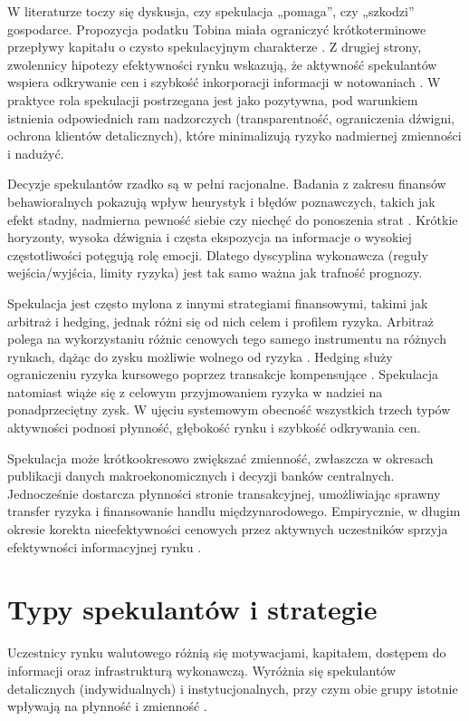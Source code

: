 W literaturze toczy się dyskusja, czy spekulacja „pomaga”, czy „szkodzi” gospodarce. Propozycja podatku Tobina miała ograniczyć krótkoterminowe przepływy kapitału o czysto spekulacyjnym charakterze \parencite{tobin1978}. Z drugiej strony, zwolennicy hipotezy efektywności rynku wskazują, że aktywność spekulantów wspiera odkrywanie cen i szybkość inkorporacji informacji w notowaniach \parencite{fama1970}. W praktyce rola spekulacji postrzegana jest jako pozytywna, pod warunkiem istnienia odpowiednich ram nadzorczych (transparentność, ograniczenia dźwigni, ochrona klientów detalicznych), które minimalizują ryzyko nadmiernej zmienności i nadużyć.


Decyzje spekulantów rzadko są w pełni racjonalne. Badania z zakresu finansów behawioralnych pokazują wpływ heurystyk i błędów poznawczych, takich jak efekt stadny, nadmierna pewność siebie czy niechęć do ponoszenia strat \parencite{shleifer2000}. Krótkie horyzonty, wysoka dźwignia i częsta ekspozycja na informacje o wysokiej częstotliwości potęgują rolę emocji. Dlatego dyscyplina wykonawcza (reguły wejścia/wyjścia, limity ryzyka) jest tak samo ważna jak trafność prognozy.


Spekulacja jest często mylona z innymi strategiami finansowymi, takimi jak arbitraż i hedging, jednak różni się od nich celem i profilem ryzyka. Arbitraż polega na wykorzystaniu różnic cenowych tego samego instrumentu na różnych rynkach, dążąc do zysku możliwie wolnego od ryzyka \parencite{fabozzi2015}. Hedging służy ograniczeniu ryzyka kursowego poprzez transakcje kompensujące \parencite{mishkin2019}. Spekulacja natomiast wiąże się z celowym przyjmowaniem ryzyka w nadziei na ponadprzeciętny zysk. W ujęciu systemowym obecność wszystkich trzech typów aktywności podnosi płynność, głębokość rynku i szybkość odkrywania cen.


Spekulacja może krótkookresowo zwiększać zmienność, zwłaszcza w okresach publikacji danych makroekonomicznych i decyzji banków centralnych. Jednocześnie dostarcza płynności stronie transakcyjnej, umożliwiając sprawny transfer ryzyka i finansowanie handlu międzynarodowego. Empirycznie, w długim okresie korekta nieefektywności cenowych przez aktywnych uczestników sprzyja efektywności informacyjnej rynku \parencite{mishkin2019}.

\section{Typy spekulantów i strategie}

Uczestnicy rynku walutowego różnią się motywacjami, kapitałem, dostępem do informacji oraz infrastrukturą wykonawczą. Wyróżnia się spekulantów detalicznych (indywidualnych) i instytucjonalnych, przy czym obie grupy istotnie wpływają na płynność i zmienność \parencite{hull2018}.

